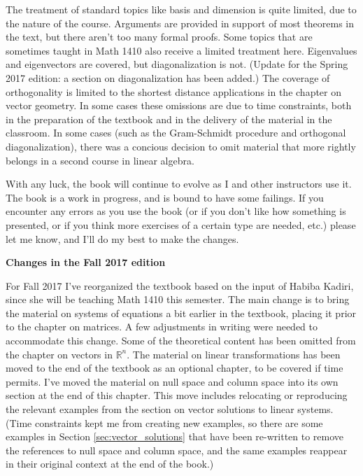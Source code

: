 The treatment of standard topics like basis and dimension is quite limited, due to the nature of the course. Arguments are provided in support of most theorems in the text, but there aren't too many formal proofs. Some topics that are sometimes taught in Math 1410 also receive a limited treatment here. Eigenvalues and eigenvectors are covered, but diagonalization is not. (Update for the Spring 2017 edition: a section on diagonalization has been added.) The coverage of orthogonality is limited to the shortest distance applications in the chapter on vector geometry. In some cases these omissions are due to time constraints, both in the preparation of the textbook and in the delivery of the material in the classroom. In some cases (such as the Gram-Schmidt procedure and orthogonal diagonalization), there was a concious decision to omit material that more rightly belongs in a second course in linear algebra.

With any luck, the book will continue to evolve as I and other instructors use it. The book is a work in progress, and is bound to have some failings. If you encounter any errors as you use the book (or if you don't like how something is presented, or if you think more exercises of a certain type are needed, etc.) please let me know, and I'll do my best to make the changes. 



\pagebreak

\noindent\textbf{\large Changes in the Fall 2017 edition}

For Fall 2017 I've reorganized the textbook based on the input of Habiba Kadiri, since she will be teaching Math 1410 this semester. The main change is to bring the material on systems of equations a bit earlier in the textbook, placing it prior to the chapter on matrices. A few adjustments in writing were needed to accommodate this change. Some of the theoretical content has been omitted from the chapter on vectors in $\mathbb{R}^n$. The material on linear transformations has been moved to the end of the textbook as an optional chapter, to be covered if time permits. I've moved the material on null space and column space into its own section at the end of this chapter. This move includes relocating or reproducing the relevant examples from the section on vector solutions to linear systems. (Time constraints kept me from creating new examples, so there are some examples in Section \ref{sec:vector_solutions} that have been re-written to remove the references to null space and column space, and the same examples reappear in their original context at the end of the book.)

